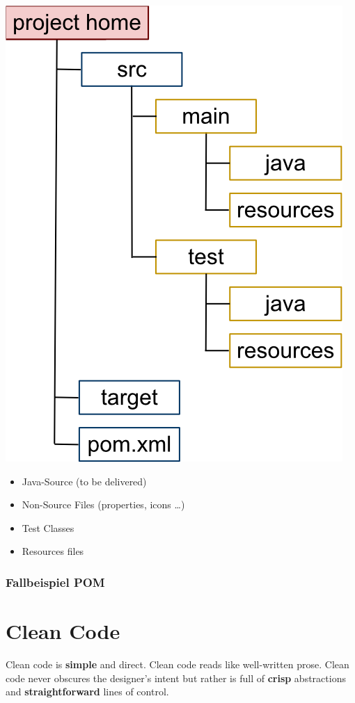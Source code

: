 \documentclass[10pt]{article}
\begin{document}
			\includegraphics[scale=0.5]{assets/mvn_directory_structure}
               
                \begin{itemize}
                \item Java-Source (to be delivered)
                \item Non-Source Files (properties, icons \ldots)
                \item Test Classes
                \item Resources files
            \end{itemize}

	\newpage
    \subsubsection{Fallbeispiel POM}
    
	\newpage
	

    \section{Clean Code}
    Clean code is \textbf{simple} and direct. Clean code reads like well-written prose. Clean code never obscures the designer\textquoteright s intent but rather is full of \textbf{crisp} abstractions and \textbf{straightforward} lines of control.
\end{document}
